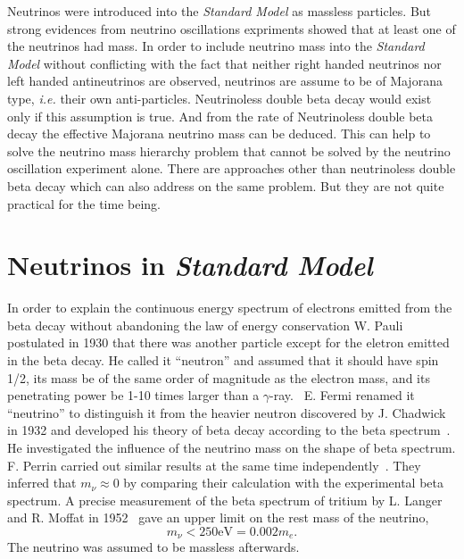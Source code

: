 Neutrinos were introduced into the \emph{Standard Model} as massless
particles. But strong evidences from neutrino oscillations expriments
showed that at least one of the neutrinos had mass. In order to
include neutrino mass into the \emph{Standard Model} without
conflicting with the fact that neither right handed neutrinos nor left
handed antineutrinos are observed, neutrinos are assume to be of
Majorana type, \textit{i.e.} their own anti-particles. Neutrinoless
double beta decay would exist only if this assumption is true. And
from the rate of Neutrinoless double beta decay the effective Majorana
neutrino mass can be deduced. This can help to solve the neutrino mass
hierarchy problem that cannot be solved by the neutrino oscillation
experiment alone. There are approaches other than neutrinoless double
beta decay which can also address on the same problem. But they are
not quite practical for the time being.

\section{Neutrinos in \emph{Standard Model}}
\label{sec:sm}
In order to explain the continuous energy spectrum of electrons
emitted from the beta decay without abandoning the law of energy
conservation W. Pauli postulated in 1930 that there was another
particle except for the eletron emitted in the beta decay. He called
it ``neutron'' and assumed that it should have spin 1/2, its mass be
of the same order of magnitude as the electron mass, and its
penetrating power be 1-10 times larger than a
$\gamma$-ray.~\cite{Pau30} E. Fermi renamed it ``neutrino'' to
distinguish it from the heavier neutron discovered by J. Chadwick in
1932 and developed his theory of beta decay according to the beta
spectrum~\cite{Fer33,Fer34}. He investigated the influence of the
neutrino mass on the shape of beta spectrum. F. Perrin carried out
similar results at the same time independently~\cite{Per33}. They
inferred that $m_\nu \approx 0$ by comparing their calculation with
the experimental beta spectrum. A precise measurement of the beta
spectrum of tritium by L. Langer and R. Moffat in 1952~\cite{Lan52}
gave an upper limit on the rest mass of the neutrino,
$$m_\nu < 250 \mbox{eV} = 0.002m_e.$$
The neutrino was assumed to be massless afterwards.

